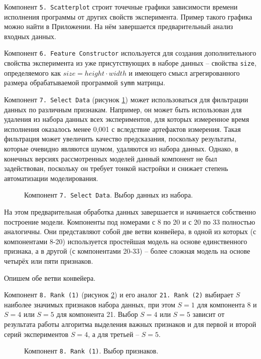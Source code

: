Компонент \texttt{5. Scatterplot} строит точечные графики зависимости времени исполнения программы от других свойств эксперимента. Пример такого графика можно найти в Приложении. На нём завершается предварительный анализ входных данных.

Компонент \texttt{6. Feature Constructor} используется для создания дополнительного свойства эксперимента из уже присутствующих в наборе данных -- свойства \texttt{size}, определяемого как $size = height \cdot width$ и имеющего смысл агрегированного размера обрабатываемой программой \texttt{symm} матрицы.

Компонент \texttt{7. Select Data} (рисунок \ref{img:7-Select-Data}) может использоваться для фильтрации данных по различным признакам. Например, он может быть использован для удаления из набора данных всех экспериментов, для которых измеренное время исполнения оказалось менее 0,001 с вследствие артефактов измерения. Такая фильтрация может увеличить качество предсказания, поскольку результаты, которые очевидно являются шумом, удаляются из набора данных. Однако, в конечных версиях рассмотренных моделей данный компонент не был задействован, поскольку он требует тонкой настройки и снижает степень автоматизации моделирования.

\begin{figure}[H]
    \caption{Компонент \texttt{7. Select Data}. Выбор данных из набора.}
    \label{img:7-Select-Data}
\end{figure}

На этом предварительная обработка данных завершается и начинается собственно построение модели. Компоненты под номерами с 8 по 20 и с 20 по 33 полностью аналогичны. Они представляют собой две ветви конвейера, в одной из которых (с компонентами 8-20) используется простейшая модель на основе единственного признака, а в другой (с компонентами 20-33) -- более сложная модель на основе четырёх или пяти признаков.

Опишем обе ветви конвейера.

Компонент \texttt{8. Rank (1)} (рисунок \ref{img:8-Rank-1}) и его аналог \texttt{21. Rank (2)}  выбирает $S$ наиболее значимых признаков набора данных, при этом $S = 1$ для компонента 8 и $S = 4$ или $S = 5$ для компонента 21. Выбор $S = 4$ или $S = 5$ зависит от результата работы алгоритма выделения важных признаков и для первой и второй серий экспериментов $S = 4$, а для третьей -- $S = 5$.

\begin{figure}[H]
    \caption{Компонент \texttt{8. Rank (1)}. Выбор признаков.}
    \label{img:8-Rank-1}
\end{figure}

